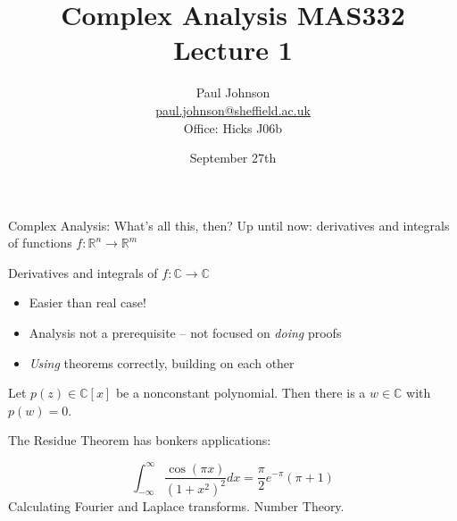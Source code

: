 \documentclass{beamer}
\title{Complex Analysis MAS332 \\ Lecture 1}
\author{Paul Johnson \\ \href{mailto:paul.johnson@sheffield.ac.uk}{paul.johnson@sheffield.ac.uk} \\ Office: Hicks J06b}
\date{September 27th}
\newcommand{\C}{\mathbb{C}}
\newcommand{\R}{\mathbb{R}}
\begin{document}
\maketitle






  \begin{frame}{Complex Analysis: What's all this, then?}
 Up until now: derivatives and integrals of functions $f:\R^n\to \R^m$

 \begin{block}{Derivatives and integrals of $f:\C\to\C$}
     \begin{itemize}
     \item Easier than real case!
     \item Analysis not a prerequisite -- not focused on \emph{doing} proofs
     \item \emph{Using} theorems correctly, building on each other
     \end{itemize}
 \end{block}
 
   \begin{theorem} Let $p(z)\in \C[x]$ be a nonconstant polynomial.  Then there is a $w\in\C$ with $p(w)=0$.
\end{theorem}

\begin{block}{The Residue Theorem has bonkers applications:}   

  $$\int_{-\infty}^\infty \frac{\cos(\pi x)}{(1+x^2)^2}dx=\frac{\pi}{2}e^{-\pi}(\pi+1)$$
Calculating Fourier and Laplace transforms. Number Theory.
\end{block}

  
  \end{frame}
\end{document}
